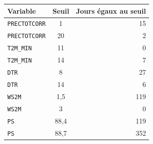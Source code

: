 \small
\begin{tabular}{lcr}
\toprule
\rowcolor{NuitBleue!90}
\color{white}\textbf{Variable} & \color{white}\textbf{Seuil} & \color{white}\textbf{Jours égaux au seuil} \\
\midrule
\texttt{PRECTOTCORR} & 1 & 15 \\
\texttt{PRECTOTCORR} & 20 & 2 \\
\texttt{T2M\_MIN} & 11 & 0 \\
\texttt{T2M\_MIN} & 14 & 7 \\
\texttt{DTR} & 8 & 27 \\
\texttt{DTR} & 14 & 6 \\
\texttt{WS2M} & 1,5 & 119 \\
\texttt{WS2M} & 3 & 0 \\
\texttt{PS} & 88,4 & 119 \\
\texttt{PS} & 88,7 & 352 \\
\bottomrule
\end{tabular}
